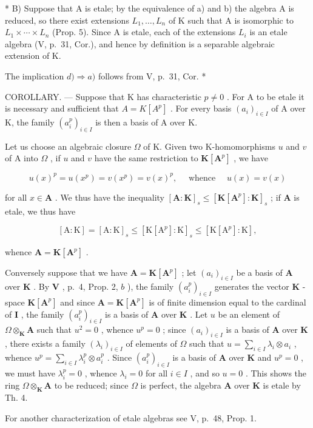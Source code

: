 * B) Suppose that A is etale; by the equivalence of a) and b) the algebra A is reduced, so there exist extensions \(L_{1}, \ldots, L_{n}\) of K such that A is isomorphic to \(L_{1} \times \cdots \times L_{n}\) (Prop. 5). Since A is etale, each of the extensions \(L_{i}\) is an etale algebra (V, p.~31, Cor.), and hence by definition is a separable algebraic extension of K.

The implication \(d) \Rightarrow a)\) follows from V, p.~31, Cor. *

COROLLARY. --- Suppose that K has characteristic \(p \neq 0\) . For A to be etale it is necessary and sufficient that \(A = K[A^{p}]\) . For every basis \((a_{i})_{i \in I}\) of A over K, the family \((a_{i}^{p})_{i \in I}\) is then a basis of A over K.

Let us choose an algebraic closure \(\Omega\) of K. Given two K-homomorphisms \(u\) and \(v\) of A into \(\Omega\) , if \(u\) and \(v\) have the same restriction to \(\mathbf{K}[\mathbf{A}^p]\) , we have

\[
u (x) ^ {p} = u \left(x ^ {p}\right) = v \left(x ^ {p}\right) = v (x) ^ {p}, \quad \text { whence } \quad u (x) = v (x)
\]

for all \(x \in \mathbf{A}\) . We thus have the inequality \([\mathbf{A} : \mathbf{K}]_s \leqslant [\mathbf{K}[\mathbf{A}^p] : \mathbf{K}]_s\) ; if \(\mathbf{A}\) is etale, we thus have

\[
[ \mathrm{A}: \mathrm{K} ] = [ \mathrm{A}: \mathrm{K} ] _ {s} \leqslant [ \mathrm{K} [ \mathrm{A} ^ {p} ]: \mathrm{K} ] _ {s} \leqslant [ \mathrm{K} [ \mathrm{A} ^ {p} ]: \mathrm{K} ],
\]

whence \(\mathbf{A} = \mathbf{K}[\mathbf{A}^p]\) .

Conversely suppose that we have \(\mathbf{A} = \mathbf{K}[\mathbf{A}^p]\) ; let \((a_i)_{i\in I}\) be a basis of \(\mathbf{A}\) over \(\mathbf{K}\) . By \(\mathbf{V}\) , p.~4, Prop. 2, \(b\) ), the family \((a_i^p)_{i\in I}\) generates the vector \(\mathbf{K}\) -space \(\mathbf{K}[\mathbf{A}^p]\) and since \(\mathbf{A} = \mathbf{K}[\mathbf{A}^p]\) is of finite dimension equal to the cardinal of \(\mathbf{I}\) , the family \((a_i^p)_{i\in I}\) is a basis of \(\mathbf{A}\) over \(\mathbf{K}\) . Let \(u\) be an element of \(\Omega \otimes_{\mathbf{K}} \mathbf{A}\) such that \(u^2 = 0\) , whence \(u^p = 0\) ; since \((a_i)_{i\in I}\) is a basis of \(\mathbf{A}\) over \(\mathbf{K}\) , there exists a family \((\lambda_i)_{i\in I}\) of elements of \(\Omega\) such that \(u = \sum_{i\in I} \lambda_i \otimes a_i\) , whence \(u^p = \sum_{i\in I} \lambda_i^p \otimes a_i^p\) . Since \((a_i^p)_{i\in I}\) is a basis of \(\mathbf{A}\) over \(\mathbf{K}\) and \(u^p = 0\) , we must have \(\lambda_i^p = 0\) , whence \(\lambda_i = 0\) for all \(i\in I\) , and so \(u = 0\) . This shows the ring \(\Omega \otimes_{\mathbf{K}} \mathbf{A}\) to be reduced; since \(\Omega\) is perfect, the algebra \(\mathbf{A}\) over \(\mathbf{K}\) is etale by Th. 4.

For another characterization of etale algebras see V, p.~48, Prop. 1.

